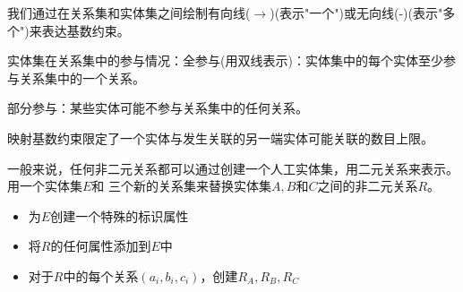 我们通过在关系集和实体集之间绘制有向线($\to$)(表示"一个")或无向线(-)(表示"多个")来表达基数约束。

实体集在关系集中的参与情况：全参与(用双线表示)：实体集中的每个实体至少参与关系集中的一个关系。

部分参与：某些实体可能不参与关系集中的任何关系。

映射基数约束限定了一个实体与发生关联的另一端实体可能关联的数目上限。

一般来说，任何非二元关系都可以通过创建一个人工实体集，用二元关系来表示。用一个实体集$E$和
三个新的关系集来替换实体集$A,B$和$C$之间的非二元关系$R$。
\begin{itemize}
    \item 为$E$创建一个特殊的标识属性
    \item 将$R$的任何属性添加到$E$中
    \item 对于$R$中的每个关系$(a_i,b_i,c_i)$，创建$R_A,R_B,R_C$
\end{itemize}